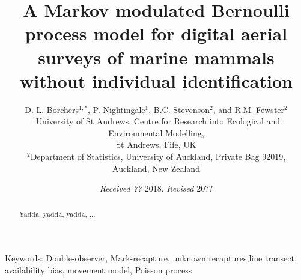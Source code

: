 \documentclass[useAMS, usenatbib, referee]{biom}
\begin{document}
\title{A Markov modulated Bernoulli process model for digital aerial surveys of marine mammals without individual identification}

\author{D. L. Borchers\(^{1, *}\),
P. Nightingale\(^1\),
B.C. Stevenson\(^{2}\), and
R.M. Fewster\(^{2}\) \\
\(^1\)University of St Andrews, Centre for Research into Ecological and Environmental Modelling, \\ St Andrews, Fife, UK \\
\(^2\)Department of Statistics, University of Auckland, Private Bag 92019, \\ Auckland, New Zealand
}




\date{{\it Received ??} 2018. {\it Revised } 20??}

\pagerange{\pageref{firstpage}--\pageref{lastpage}} 



\label{firstpage}


\begin{abstract}
Yadda, yadda, yadda, ...
\end{abstract}

\begin{keywords}
Keywords: Double-observer, Mark-recapture, unknown recaptures,line transect, availability bias, movement model, Poisson process
\end{keywords}


\maketitle
\end{document}
